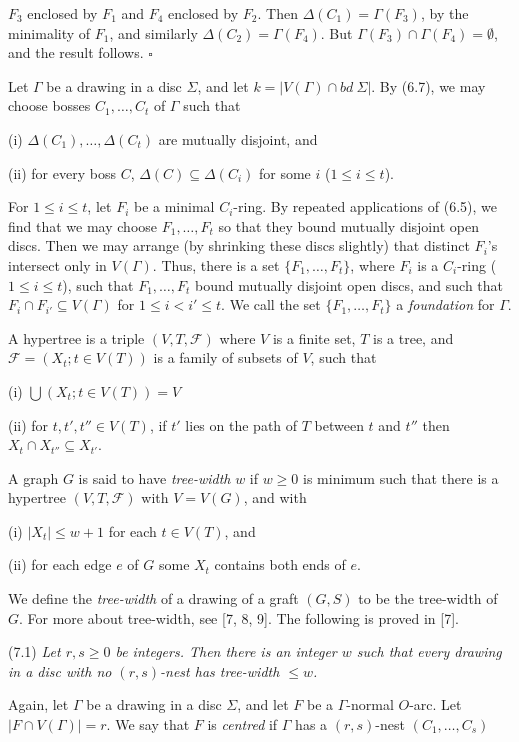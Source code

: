 \noindent $F_3$ enclosed by $F_1$ and $F_4$ enclosed by $F_2$. Then $\Delta(C_1) = \Gamma(F_3)$, by the minimality of $F_1$, and similarly $\Delta(C_2) = \Gamma(F_4)$. But $\Gamma(F_3) \cap \Gamma(F_4) = \emptyset$, and the result follows. $\square$

Let $\Gamma$ be a drawing in a disc $\Sigma$, and let $k = |V(\Gamma) \cap bd\ \Sigma|$. By (6.7), we may choose bosses $C_1, \dots, C_t$ of $\Gamma$ such that

\hspace*{12pt}(i) $\Delta(C_1), \dots, \Delta(C_t)$ are mutually disjoint, and

\hspace*{12pt}(ii) for every boss $C$, $\Delta(C) \subseteq \Delta(C_i)$ for some $i$ ($1 \le i \le t$).

For $1 \le i \le t$, let $F_i$ be a minimal $C_i$-ring. By repeated applications of (6.5), we find that we may choose $F_1, \dots, F_t$ so that they bound mutually disjoint open discs. Then we may arrange (by shrinking these discs slightly) that distinct $F_i$'s intersect only in $V(\Gamma)$. Thus, there is a set $\{F_1, \dots, F_t\}$, where $F_i$ is a $C_i$-ring ($1 \le i \le t$), such that $F_1, \dots, F_t$ bound mutually disjoint open discs, and such that $F_i \cap F_{i'} \subseteq V(\Gamma)$ for $1 \le i < i' \le t$. We call the set $\{F_1, \dots, F_t\}$ a \textit{foundation} for $\Gamma$.


A hypertree is a triple $(V, T, \mathcal{F})$ where $V$ is a finite set, $T$ is a tree, and $\mathcal{F} = (X_t ; t \in V(T))$ is a family of subsets of $V$, such that

\hspace*{12pt}(i) $\bigcup (X_t ; t \in V(T)) = V$

\hspace*{12pt}(ii) for $t, t', t'' \in V(T)$, if $t'$ lies on the path of $T$ between $t$ and $t''$ then $X_t \cap X_{t''} \subseteq X_{t'}$.

A graph $G$ is said to have \textit{tree-width} $w$ if $w \ge 0$ is minimum such that there is a hypertree $(V, T, \mathcal{F})$ with $V = V(G)$, and with

\hspace*{12pt}(i) $|X_t| \le w + 1$ for each $t \in V(T)$, and

\hspace*{12pt}(ii) for each edge $e$ of $G$ some $X_t$ contains both ends of $e$.

We define the \textit{tree-width} of a drawing of a graft $(G, S)$ to be the tree-width of $G$. For more about tree-width, see [7, 8, 9]. The following is proved in [7].

\stmt
(7.1) \textit{Let $r, s \ge 0$ be integers. Then there is an integer $w$ such that every drawing in a disc with no $(r, s)$-nest has tree-width $\le w$.}


Again, let $\Gamma$ be a drawing in a disc $\Sigma$, and let $F$ be a $\Gamma$-normal $O$-arc. Let $|F \cap V(\Gamma)| = r$. We say that $F$ is \textit{centred} if $\Gamma$ has a $(r, s)$-nest $(C_1, \dots, C_s)$
